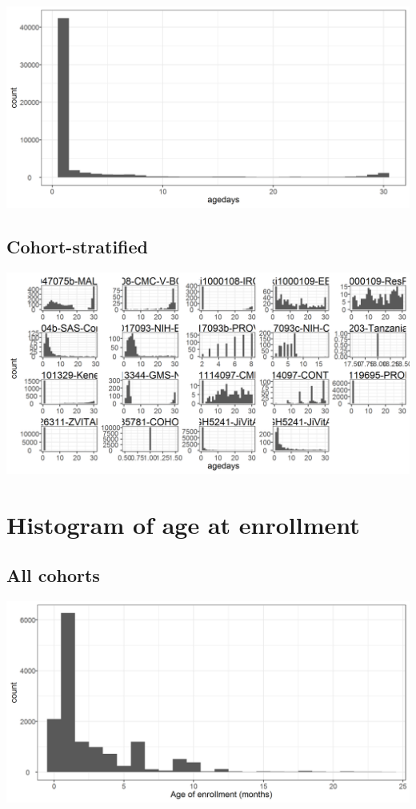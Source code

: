 \documentclass[9pt,]{book}
\begin{document}
\includegraphics[width=33.33in]{figure-copies/age_histogram_first_month}

\hypertarget{cohort-stratified}{%
\subsection{Cohort-stratified}\label{cohort-stratified}}

\includegraphics[width=33.33in]{figure-copies/age_histogram_first_month_cohort}

\hypertarget{histogram-of-age-at-enrollment}{%
\section{Histogram of age at enrollment}\label{histogram-of-age-at-enrollment}}

\hypertarget{all-cohorts-1}{%
\subsection{All cohorts}\label{all-cohorts-1}}

\includegraphics[width=33.33in]{figure-copies/enrollment_age_histogram_over_7d}
\end{document}
